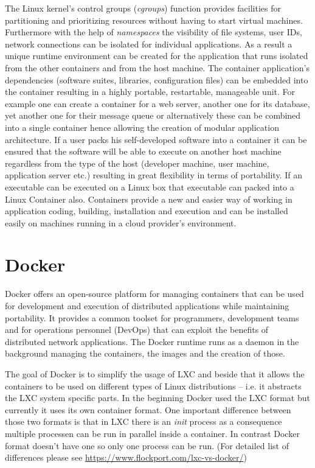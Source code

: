 \documentclass[a4paper]{article}
\begin{document}
The Linux kernel's control groups (\emph{cgroups}) function provides facilities for partitioning and prioritizing
resources without having to
start virtual machines. Furthermore with the help of \emph{namespaces} the visibility of file systems, user IDs,
network connections can be
isolated for individual applications. As a result a unique runtime environment can be created for the application that
runs isolated from
the other containers and from the host machine.
The container application's dependencies (software suites, libraries, configuration files) can be embedded into the
container resulting in
a highly portable, restartable, manageable unit.
For example one can create a container for a web server, another one for its database, yet another one for their message
queue or alternatively these
can be combined into a single container hence allowing the creation of modular application architecture.
If a user packs his self-developed software into a container it can be ensured that the software will be able to
execute on another host machine regardless from the type of the host (developer machine, user machine, application
server etc.) resulting in great flexibility in terms of portability.
If an executable can be executed on a Linux box that executable can packed into a Linux Container also. Containers provide a new
and easier way of working in application coding, building, installation and execution and can be installed easily on
machines running in a cloud provider's environment.

\section{Docker}

Docker offers an open-source platform for managing containers that can be used for development and execution of
distributed applications
while maintaining portability.
It provides a common toolset for programmers, development teams and for operations personnel (DevOps) that can
exploit the benefits
of distributed network applications.
The Docker runtime runs as a daemon in the background managing the containers, the images and the creation of those.

The goal of Docker is to simplify the usage of LXC and beside that it allows the containers to be used on different
types of Linux
distributions -- i.e. it abstracts the LXC system specific parts. In the beginning Docker used the LXC format but
currently it uses its own
container format. One important difference between those two formats is that in LXC there is an \emph{init} process as
a consequence multiple
processen can be run in parallel inside a container. In contrast Docker format doesn't have one so only one process can be run. (For detailed list of
differences please see \url{https://www.flockport.com/lxc-vs-docker/})
\end{document}
